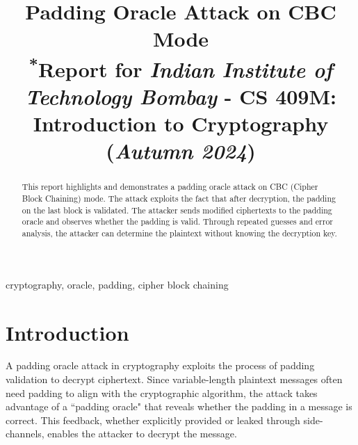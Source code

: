 \documentclass[conference]{IEEEtran}
\begin{document}
\title{Padding Oracle Attack on CBC Mode\\
{\footnotesize \textsuperscript{*}Report for \textit{Indian Institute of Technology Bombay} - CS 409M: Introduction to Cryptography ({\it Autumn 2024})}
}

\author{%
\and
{}%
}

\maketitle

\begin{abstract}
This report highlights and demonstrates a padding oracle attack on CBC (Cipher Block Chaining) mode.
The attack exploits the fact that after decryption, the padding on the last block is validated. The attacker sends modified ciphertexts to the padding oracle and observes whether the padding is valid. Through repeated guesses and error analysis, the attacker can determine the plaintext without knowing the decryption key.

\end{abstract}

\begin{IEEEkeywords}
cryptography, oracle, padding, cipher block chaining
\end{IEEEkeywords}

\section{Introduction}
A padding oracle attack in cryptography exploits the process of padding validation to decrypt ciphertext. Since variable-length plaintext messages often need padding to align with the cryptographic algorithm, the attack takes advantage of a ``padding oracle" that reveals whether the padding in a message is correct. This feedback, whether explicitly provided or leaked through side-channels, enables the attacker to decrypt the message.
\end{document}
